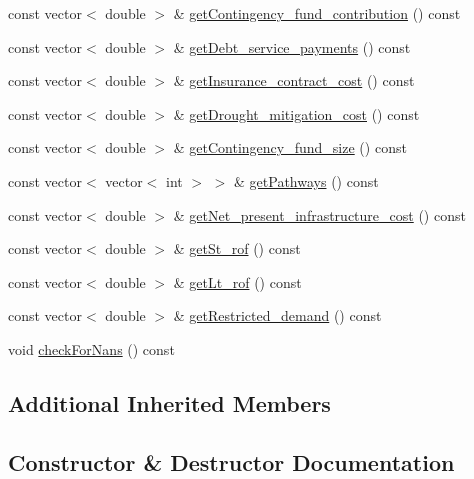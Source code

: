 \begin{DoxyCompactItemize}
const vector$<$ double $>$ \& \mbox{\hyperlink{classUtilitiesDataCollector_ab699a97a328339a25b848593ab74ad0b}{get\+Contingency\+\_\+fund\+\_\+contribution}} () const
\item 
const vector$<$ double $>$ \& \mbox{\hyperlink{classUtilitiesDataCollector_a7e5dce8713ac981d00880349136a4eed}{get\+Debt\+\_\+service\+\_\+payments}} () const
\item 
const vector$<$ double $>$ \& \mbox{\hyperlink{classUtilitiesDataCollector_af71c346629fb5e70c8c72a4c9021bd0c}{get\+Insurance\+\_\+contract\+\_\+cost}} () const
\item 
const vector$<$ double $>$ \& \mbox{\hyperlink{classUtilitiesDataCollector_aa76522a5400395bb3bf73512996dcccb}{get\+Drought\+\_\+mitigation\+\_\+cost}} () const
\item 
const vector$<$ double $>$ \& \mbox{\hyperlink{classUtilitiesDataCollector_a0533e321af5487a24c1721ae62b8f0c6}{get\+Contingency\+\_\+fund\+\_\+size}} () const
\item 
const vector$<$ vector$<$ int $>$ $>$ \& \mbox{\hyperlink{classUtilitiesDataCollector_ab87447b4f0e8c1d698830d08b9fcf04d}{get\+Pathways}} () const
\item 
const vector$<$ double $>$ \& \mbox{\hyperlink{classUtilitiesDataCollector_a1966229d608eb5ba0c87307fb9aaaffe}{get\+Net\+\_\+present\+\_\+infrastructure\+\_\+cost}} () const
\item 
const vector$<$ double $>$ \& \mbox{\hyperlink{classUtilitiesDataCollector_aa79cd7f8b1390abed3e6f85a20d503a0}{get\+St\+\_\+rof}} () const
\item 
const vector$<$ double $>$ \& \mbox{\hyperlink{classUtilitiesDataCollector_aa69490f96d65e0fd8418c13e6d6b2143}{get\+Lt\+\_\+rof}} () const
\item 
const vector$<$ double $>$ \& \mbox{\hyperlink{classUtilitiesDataCollector_ad4a8d3c75aa8365d54abcb711ade26db}{get\+Restricted\+\_\+demand}} () const
\item 
void \mbox{\hyperlink{classUtilitiesDataCollector_af01392bbfae02a1fd9ee65b3c97a73a3}{check\+For\+Nans}} () const
\end{DoxyCompactItemize}
\subsection*{Additional Inherited Members}


\subsection{Constructor \& Destructor Documentation}
\mbox{\label{classUtilitiesDataCollector_a7aee55a1cbd0fcdca59339a9e78ed08b}} 
